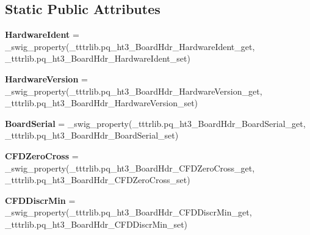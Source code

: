 \subsection*{Static Public Attributes}
\begin{DoxyCompactItemize}
\item 
\mbox{\label{classtttrlib_1_1pq__ht3___board_hdr_a298965a07956f4312631d51837410e4d}} 
{\bfseries Hardware\+Ident} = \+\_\+swig\+\_\+property(\+\_\+tttrlib.\+pq\+\_\+ht3\+\_\+\+Board\+Hdr\+\_\+\+Hardware\+Ident\+\_\+get, \+\_\+tttrlib.\+pq\+\_\+ht3\+\_\+\+Board\+Hdr\+\_\+\+Hardware\+Ident\+\_\+set)
\item 
\mbox{\label{classtttrlib_1_1pq__ht3___board_hdr_a4bfdccc4e13ae55252df26b5b88b17f6}} 
{\bfseries Hardware\+Version} = \+\_\+swig\+\_\+property(\+\_\+tttrlib.\+pq\+\_\+ht3\+\_\+\+Board\+Hdr\+\_\+\+Hardware\+Version\+\_\+get, \+\_\+tttrlib.\+pq\+\_\+ht3\+\_\+\+Board\+Hdr\+\_\+\+Hardware\+Version\+\_\+set)
\item 
\mbox{\label{classtttrlib_1_1pq__ht3___board_hdr_a59159ba487a253773ff09d7681ecf1fb}} 
{\bfseries Board\+Serial} = \+\_\+swig\+\_\+property(\+\_\+tttrlib.\+pq\+\_\+ht3\+\_\+\+Board\+Hdr\+\_\+\+Board\+Serial\+\_\+get, \+\_\+tttrlib.\+pq\+\_\+ht3\+\_\+\+Board\+Hdr\+\_\+\+Board\+Serial\+\_\+set)
\item 
\mbox{\label{classtttrlib_1_1pq__ht3___board_hdr_acc5baaf4fbc766cbd6b6e9d20eaf0f49}} 
{\bfseries C\+F\+D\+Zero\+Cross} = \+\_\+swig\+\_\+property(\+\_\+tttrlib.\+pq\+\_\+ht3\+\_\+\+Board\+Hdr\+\_\+\+C\+F\+D\+Zero\+Cross\+\_\+get, \+\_\+tttrlib.\+pq\+\_\+ht3\+\_\+\+Board\+Hdr\+\_\+\+C\+F\+D\+Zero\+Cross\+\_\+set)
\item 
\mbox{\label{classtttrlib_1_1pq__ht3___board_hdr_a5a9ac08108f76fd4c13be3c71d15592b}} 
{\bfseries C\+F\+D\+Discr\+Min} = \+\_\+swig\+\_\+property(\+\_\+tttrlib.\+pq\+\_\+ht3\+\_\+\+Board\+Hdr\+\_\+\+C\+F\+D\+Discr\+Min\+\_\+get, \+\_\+tttrlib.\+pq\+\_\+ht3\+\_\+\+Board\+Hdr\+\_\+\+C\+F\+D\+Discr\+Min\+\_\+set)
\item 
\mbox{\label{classtttrlib_1_1pq__ht3___board_hdr_aa82eada0ea6f239ba58123087cafac64}} 

\end{DoxyCompactItemize}
